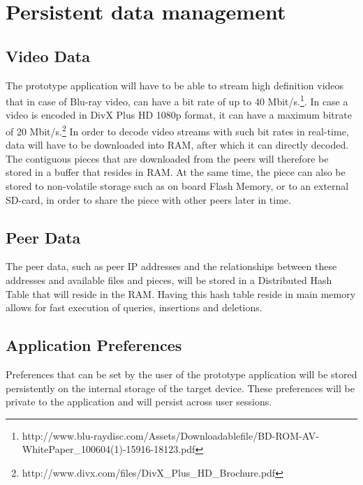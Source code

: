 \section{Persistent data management}
\label{sec:perdata}
\subsection{Video Data}
The prototype application will have to be able to stream high definition videos that in case of Blu-ray video, can have a bit rate of up to 40 Mbit/s.\footnote{http://www.blu-raydisc.com/Assets/Downloadablefile/BD-ROM-AV-WhitePaper\_100604(1)-15916-18123.pdf}. In case a video is encoded in DivX Plus HD 1080p format, it can have a maximum bitrate of 20 Mbit/s.\footnote{http://www.divx.com/files/DivX\_Plus\_HD\_Brochure.pdf} In order to decode video streams with such bit rates in real-time, data will have to be downloaded into RAM, after which it can directly decoded. The contiguous pieces that are downloaded from the peers will therefore be stored in a buffer that resides in RAM. At the same time, the piece can also be stored to non-volatile storage such as on board Flash Memory, or to an external SD-card, in order to share the piece with other peers later in time.
\subsection{Peer Data}
The peer data, such as peer IP addresses and the relationships between these addresses and available files and pieces, will be stored in a Distributed Hash Table that will reside in the RAM. Having this hash table reside in main memory allows for fast execution of queries, insertions and deletions.
\subsection{Application Preferences}
Preferences that can be set by the user of the prototype application will be stored persistently on the internal storage of the target device. These preferences will be private to the application and will persist across user sessions.



